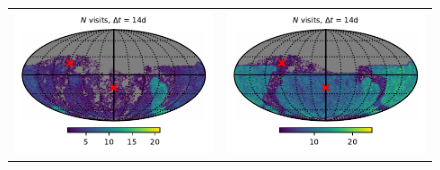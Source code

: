 \documentclass[preprintm,linenumbers]{aastex631}
\begin{document}
\begin{figure}
\begin{tabular}{@{}c@{}c@{}}
         \includegraphics{results/skymaps_cutout/skymaps_cutout_first_year_one_snap_v4_0_10yrs_db_noDD_noTwi_tscale-14_nside-256_doAllTemplateMetrics_reduceCount_g_noDD_noTwi.pdf} &
         \includegraphics{results/skymaps_cutout/skymaps_cutout_first_year_one_snap_v4_0_10yrs_db_noDD_noTwi_tscale-14_nside-256_doAllTemplateMetrics_reduceCount_r_noDD_noTwi.pdf} \\


\end{tabular}
\end{figure}
\end{document}
